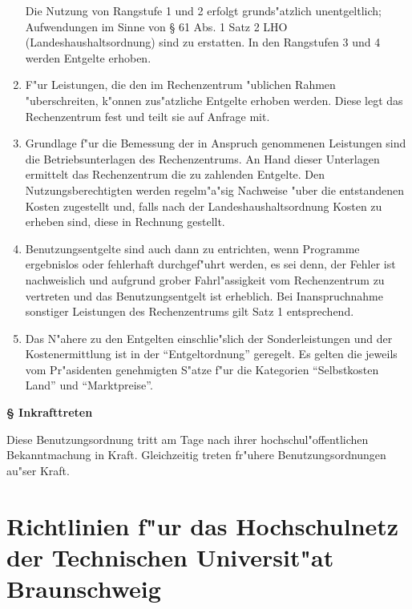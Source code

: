\documentclass[12pt,titlepage,twoside]{scrartcl}
\newcounter{para_nr}
\newcommand{\Paragraph}[1]{{\large\bf\S{}\sf\textbf{\/\stepcounter{para_nr}\arabic{para_nr} #1}}}
\begin{document}
\begin{appendix}
\begin{enumerate}
    Die Nutzung von Rangstufe 1 und 2 erfolgt grunds"atzlich unentgeltlich;
    Aufwendungen im Sinne von \S{} 61 Abs. 1 Satz 2 LHO (Landeshaushaltsordnung)
    sind zu erstatten. In den Rangstufen 3 und 4 werden Entgelte erhoben.

  \item F"ur Leistungen, die den im Rechenzentrum "ublichen Rahmen
    "uberschreiten, k"onnen zus"atzliche Entgelte erhoben werden.
    Diese legt das Rechenzentrum fest und teilt sie auf Anfrage mit.

  \item Grundlage f"ur die Bemessung der in Anspruch genommenen Leistungen
    sind die Betriebsunterlagen des Rechenzentrums. An Hand dieser Unterlagen
    ermittelt das Rechenzentrum die zu zahlenden Entgelte. Den
    Nutzungsberechtigten werden regelm"a"sig Nachweise "uber
    die entstandenen Kosten zugestellt und, falls nach der
    Landeshaushaltsordnung Kosten zu erheben sind, diese in Rechnung
    gestellt.

  \item Benutzungsentgelte sind auch dann zu entrichten, wenn Programme
    ergebnislos oder fehlerhaft durchgef"uhrt werden, es sei denn,
    der Fehler ist nachweislich und aufgrund grober Fahrl"assigkeit
    vom Rechenzentrum zu vertreten und das Benutzungsentgelt ist erheblich.
    Bei Inanspruchnahme sonstiger Leistungen des Rechenzentrums gilt
    Satz 1 entsprechend.

  \item Das N"ahere zu den Entgelten einschlie"slich der Sonderleistungen
    und der Kostenermittlung ist in der "`Entgeltordnung"' geregelt. Es gelten
    die jeweils vom Pr"asidenten genehmigten S"atze f"ur die
    Kategorien "`Selbstkosten Land"' und "`Marktpreise"'.
\end{enumerate}

\Paragraph{Inkrafttreten}

Diese Benutzungsordnung tritt am Tage nach ihrer hochschul"offentlichen
Bekanntmachung in Kraft. Gleichzeitig treten fr"uhere
Benutzungsordnungen au"ser Kraft.

\clearpage

\renewcommand{\thesubsection}{\arabic{subsection}}
\renewcommand{\labelenumi}{\arabic{subsection}.\arabic{enumi}}

\section[Richtlinien f"ur das TUBS-Net]{Richtlinien f"ur das Hochschulnetz der
  Technischen Universit"at Braunschweig}
\label{TUBSnet-Richtlinien}


\end{appendix}
\end{document}
